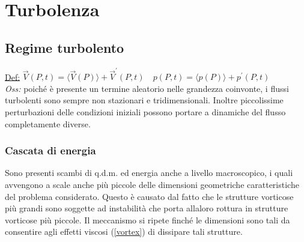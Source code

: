 \documentclass[11pt,a4paper]{report}
\begin{document}

\chapter{Turbolenza}
	\section{Regime turbolento}
	\underline{Def:} $\vec V(P,t)=\langle\vec V(P)\rangle+\vec V^\prime(P,t)\quad p(P,t)=\langle p(P)\rangle+p^\prime(P,t)$\\
	\textit{Oss:} poiché è presente un termine aleatorio nelle grandezza coinvonte, i flussi turbolenti sono sempre non stazionari e tridimensionali. Inoltre piccolissime perturbazioni delle condizioni iniziali possono portare a dinamiche del flusso completamente diverse.
		\subsection{Cascata di energia}
		Sono presenti scambi di q.d.m. ed energia anche a livello macroscopico, i quali avvengono a scale anche più piccole delle dimensioni geometriche caratteristiche del problema considerato.  Questo è causato dal fatto che le strutture vorticose più grandi sono soggette ad instabilità che porta allaloro rottura in strutture vorticose più piccole. Il meccanismo si ripete finché le dimensioni sono tali da consentire agli effetti viscosi (\ref{vortex}) di dissipare tali strutture.
\end{document}
